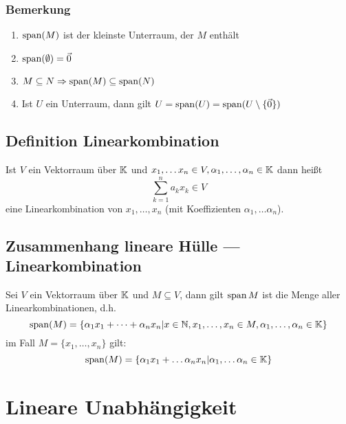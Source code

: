\subsubsection{Bemerkung}
\begin{enumerate}
    \item $\operatorname{span}(M)$ ist der kleinste Unterraum, der $M$ enthält
    \item $\operatorname{span}(\emptyset) = \vec{0}$
    \item $M \subseteq N \Rightarrow \operatorname{span}(M) \subseteq \operatorname{span}(N)$
    \item Ist $U$ ein Unterraum, dann gilt $U=\operatorname{span}(U)=\operatorname{span}(U \setminus \{\vec{0}\})$
\end{enumerate}

\subsection{Definition Linearkombination}
Ist $V$ ein Vektorraum über $\mathbb{K}$ und $x_1, \ldots x_n \in V, \alpha_1, \ldots,
\alpha_n \in \mathbb{K}$ dann heißt
\begin{equation*}
    \sum_{k=1}^n a_k x_k \in V
\end{equation*}
eine Linearkombination von $x_1, \ldots, x_n$ (mit Koeffizienten $\alpha_1, \ldots
\alpha_n$).

\subsection{Zusammenhang lineare Hülle --- Linearkombination}
Sei $V$ ein Vektorraum über $\mathbb{K}$ und $M \subseteq V$, dann gilt $\operatorname{span}{M}$ ist
die Menge aller Linearkombinationen, d.h.
\begin{equation*}
    \operatorname{span}(M) = \{\alpha_1 x_1 + \cdots + \alpha_n x_n \vert x \in \mathbb{N},
    x_1, \ldots, x_n \in M, \alpha_1, \ldots, \alpha_n \in \mathbb{K} \}
\end{equation*}
im Fall $M=\{x_1, \ldots, x_n\}$ gilt:
\begin{equation*}
    \operatorname{span}(M) =  \{\alpha_1 x_1 + \ldots \alpha_n x_n \vert \alpha_1, \ldots
    \alpha_n \in \mathbb{K} \}
\end{equation*}

\section{Lineare Unabhängigkeit}
